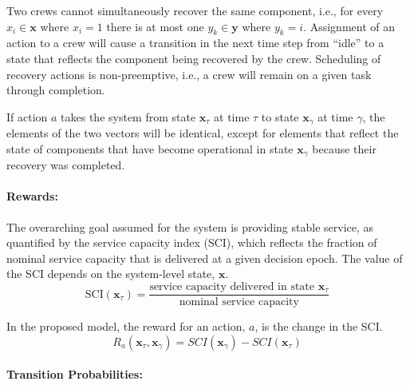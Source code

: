\documentclass[runningheads]{llncs}
\begin{document}
Two crews cannot simultaneously recover the same component, i.e., for every $x_i \in \mathbf{x}$ where $x_i = 1$ there is at most one $y_k \in \mathbf{y}$ where $y_k = i$. Assignment of an action to a crew will cause a transition in the next time step from ``idle'' to a state that reflects the component being recovered by the crew. Scheduling of recovery actions is non-preemptive, i.e., a crew will remain on a given task through completion. 

If action $a$ takes the system from state $\mathbf{x}_\tau$ at time $\tau$ to state $\mathbf{x}_\gamma$ at time $\gamma$, the elements of the two vectors will be identical, except for elements that reflect the state of components that have become operational in state $\mathbf{x}_\gamma$ because their recovery was completed. 

\paragraph{Rewards:}
The overarching goal assumed for the system is providing stable service, as quantified by the service capacity index (SCI), which reflects the fraction of nominal service capacity that is delivered at a given decision epoch. The value of the SCI depends on the system-level state, $\mathbf{x}$.
\begin{equation}
    \text{SCI}(\mathbf{x}_\tau) = \frac{\text{service capacity delivered in state } \mathbf{x}_\tau}{\text{nominal service capacity}}
    \label{eq:ServiceLoss}
\end{equation}

In the proposed model, the reward for an action, $a$, is the change in the SCI. 
\begin{equation}
    R_a(\mathbf{x}_\tau,\mathbf{x}_\gamma) = SCI(\mathbf{x}_\gamma) - SCI(\mathbf{x}_\tau)
\end{equation}

\paragraph{Transition Probabilities:}
\end{document}

